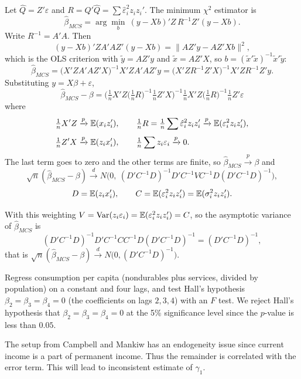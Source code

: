 \documentclass[11pt]{article}
\begin{document}
Let $\hat Q=Z'\hat\varepsilon$ and $R=\hat Q'\hat Q=\sum\hat\varepsilon_i^2z_iz_i'$. The minimum $\chi^2$ estimator is
\[
\hat\beta_{MCS}=\arg\min_b\ (y-Xb)'Z\,R^{-1}Z'(y-Xb).
\]
Write $R^{-1}=A'A$. Then
\[
(y-Xb)'Z A'A Z'(y-Xb)=\|AZ'y-AZ'Xb\|^2,
\]
which is the OLS criterion with $\tilde y=AZ'y$ and $\tilde x=AZ'X$, so $b=(\tilde x'\tilde x)^{-1}\tilde x'\tilde y$:
\[
\hat\beta_{MCS}=\big(X'ZA'AZ'X\big)^{-1}X'ZA'AZ'y=\big(X'ZR^{-1}Z'X\big)^{-1}X'ZR^{-1}Z'y .
\]
Substituting $y=X\beta+\varepsilon$,
\[
\hat\beta_{MCS}-\beta=\Big(\tfrac1nX'Z\big(\tfrac1nR\big)^{-1}\tfrac1nZ'X\Big)^{-1}\tfrac1nX'Z\Big(\tfrac1nR\Big)^{-1}\tfrac1nZ'\varepsilon
\]
where
\[
\begin{aligned}
&\tfrac1nX'Z\xrightarrow{p}\mathbb{E}(x_iz_i'),\qquad
\tfrac1nR=\tfrac1n\sum\hat\varepsilon_i^2z_iz_i'\xrightarrow{p}\mathbb{E}(\varepsilon_i^2z_iz_i'),\\[1mm]
&\tfrac1nZ'X\xrightarrow{p}\mathbb{E}(z_ix_i'),\qquad
\tfrac1n\sum z_i\varepsilon_i\xrightarrow{p}0 .
\end{aligned}
\]
The last term goes to zero and the other terms are finite, so $\hat\beta_{MCS}\xrightarrow{p}\beta$ and
\[
\sqrt n(\hat\beta_{MCS}-\beta)\xrightarrow{d}N\!\Big(0,\ (D'C^{-1}D)^{-1}D'C^{-1}VC^{-1}D(D'C^{-1}D)^{-1}\Big),
\]
\[
D=\mathbb{E}(z_ix_i'),\qquad C=\mathbb{E}(\varepsilon_i^2z_iz_i')=\mathbb{E}(\sigma_i^2z_iz_i').
\]

With this weighting $V=\operatorname{Var}(z_i\varepsilon_i)=\mathbb{E}(\varepsilon_i^2z_iz_i')=C$, so the asymptotic variance of $\hat\beta_{MCS}$ is
\[
(D'C^{-1}D)^{-1}D'C^{-1}CC^{-1}D(D'C^{-1}D)^{-1}=(D'C^{-1}D)^{-1},
\]
that is $\sqrt n(\hat\beta_{MCS}-\beta)\xrightarrow{d}N\big(0,(D'C^{-1}D)^{-1}\big)$.


Regress consumption per capita (nondurables plus services, divided by population) on a constant and four lags, and test Hall's hypothesis $\beta_2=\beta_3=\beta_4=0$ (the coefficients on lags $2,3,4$) with an $F$ test.
We reject Hall's hypothesis that $\beta_2=\beta_3=\beta_4=0$ at the 5\% significance level since the $p$-value is less than $0.05$.

The setup from Campbell and Mankiw has an endogeneity issue since current income is a part of permanent income. Thus the remainder is correlated with the error term. This will lead to inconsistent estimate of $\gamma_1$.
\end{document}
